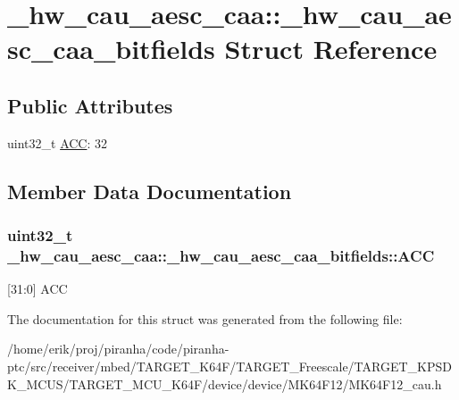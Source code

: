 \hypertarget{struct__hw__cau__aesc__caa_1_1__hw__cau__aesc__caa__bitfields}{}\section{\+\_\+hw\+\_\+cau\+\_\+aesc\+\_\+caa\+:\+:\+\_\+hw\+\_\+cau\+\_\+aesc\+\_\+caa\+\_\+bitfields Struct Reference}
\label{struct__hw__cau__aesc__caa_1_1__hw__cau__aesc__caa__bitfields}
\subsection*{Public Attributes}
\begin{DoxyCompactItemize}
\item 
uint32\+\_\+t \hyperlink{struct__hw__cau__aesc__caa_1_1__hw__cau__aesc__caa__bitfields_a0bd32e26aba6c33cd54114e19eb66bba}{A\+CC}\+: 32
\end{DoxyCompactItemize}


\subsection{Member Data Documentation}
\subsubsection[{\texorpdfstring{A\+CC}{ACC}}]{\setlength{\rightskip}{0pt plus 5cm}uint32\+\_\+t \+\_\+hw\+\_\+cau\+\_\+aesc\+\_\+caa\+::\+\_\+hw\+\_\+cau\+\_\+aesc\+\_\+caa\+\_\+bitfields\+::\+A\+CC}\hypertarget{struct__hw__cau__aesc__caa_1_1__hw__cau__aesc__caa__bitfields_a0bd32e26aba6c33cd54114e19eb66bba}{}\label{struct__hw__cau__aesc__caa_1_1__hw__cau__aesc__caa__bitfields_a0bd32e26aba6c33cd54114e19eb66bba}
\mbox{[}31\+:0\mbox{]} A\+CC 

The documentation for this struct was generated from the following file\+:\begin{DoxyCompactItemize}
\item 
/home/erik/proj/piranha/code/piranha-\/ptc/src/receiver/mbed/\+T\+A\+R\+G\+E\+T\+\_\+\+K64\+F/\+T\+A\+R\+G\+E\+T\+\_\+\+Freescale/\+T\+A\+R\+G\+E\+T\+\_\+\+K\+P\+S\+D\+K\+\_\+\+M\+C\+U\+S/\+T\+A\+R\+G\+E\+T\+\_\+\+M\+C\+U\+\_\+\+K64\+F/device/device/\+M\+K64\+F12/M\+K64\+F12\+\_\+cau.\+h\end{DoxyCompactItemize}
